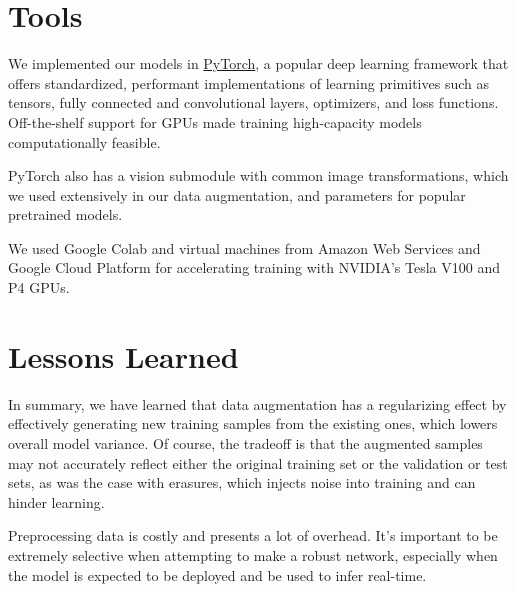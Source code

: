 \documentclass[justified]{article}
\begin{document}
  \section{Tools}

  We implemented our models in \href{https://pytorch.org/}{PyTorch}, a popular deep learning framework that offers standardized, performant implementations of learning primitives such as tensors, fully connected and convolutional layers, optimizers, and loss functions.
  Off-the-shelf support for GPUs made training high-capacity models computationally feasible.


  PyTorch also has a vision submodule with common image transformations, which we used extensively in our data augmentation, and parameters for popular pretrained models.

  We used Google Colab and virtual machines from Amazon Web Services and Google Cloud Platform for accelerating training with NVIDIA's Tesla V100 and P4 GPUs.

  \section{Lessons Learned}

  In summary, we have learned that data augmentation has a regularizing effect by effectively generating new training samples from the existing ones, which lowers overall model variance.
  Of course, the tradeoff is that the augmented samples may not accurately reflect either the original training set or the validation or test sets, as was the case with erasures, which injects noise into training and can hinder learning.

  Preprocessing data is costly and presents a lot of overhead.
  It's important to be extremely selective when attempting to make a robust network, especially when the model is expected to be deployed and be used to infer real-time.
\end{document}
